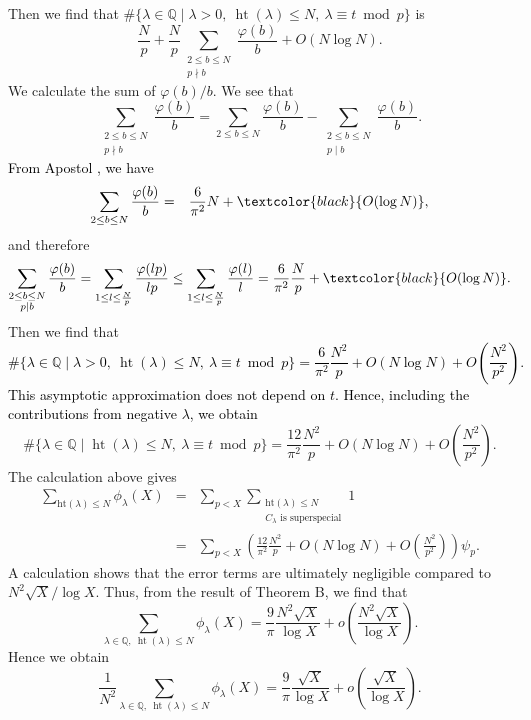 \documentclass[a4paper, 11pt]{article}
\theoremstyle{plain}
\newcommand{\?}{\textcolor{red}{??}}
\newcommand{\lm}{\lambda}
\newcommand{\bQ}{\mathbb{Q}}
\newcommand{\height}{\operatorname{ht}}
\begin{document}
\noindent
Then we find that $\# \{ \lm \in \bQ \mid \lm >0,\ \height(\lm) \le N,\ \lm \equiv t \bmod p\}$ is 
\[
 \frac{N}{p} + \frac{N}{p} \sum_{\substack{2 \le b \le N \\ p \nmid b}} \frac{\varphi(b)}{b} + O(N \log N).
\]
We calculate the sum of $\varphi(b)/b$. We see that 
\[
\sum_{\substack{2 \le b \le N \\ p \nmid b}} \frac{\varphi(b)}{b} =\sum_{2 \le b \le N} \frac{\varphi(b)}{b}- \sum_{\substack{2 \le b \le N \\ p \mid b}} \frac{\varphi(b)}{b}.
\]
\textcolor{black}{From Apostol \cite[\S 3 Exercise 5]{Apo}, we have} 
\begin{eqnarray*}
    \sum_{2 \le b \le N} \frac{\varphi(b)}{b} &=&  \frac{6}{{\pi}^2}N +\textcolor{black}{ O(\log N)},
\end{eqnarray*}
and therefore
\begin{eqnarray*}
    \sum_{\substack{2 \le b \le N \\ p \mid b}} \frac{\varphi(b)}{b}
    = \sum_{1 \le l \le \frac{N}{p}} \frac{\varphi(lp)}{lp}
    \le \sum_{1 \le l \le \frac{N}{p}} \frac{\varphi(l)}{l}= \frac{6}{{\pi}^2}\frac{N}{p} + \textcolor{black}{O(\log N)}.
\end{eqnarray*}
Then we find that \textcolor{black}{
\[
\# \{ \lm \in \bQ \mid \lm >0,\ \height (\lm) \le N,\ \lm \equiv t \bmod p\}= \frac{6}{{\pi}^2} \frac{N^2}{p} + O(N\log N) +O\left( \frac{N^2}{p^2} \right).
\]}
\textcolor{black}{This asymptotic approximation does not depend on $t$. Hence, including the contributions from negative $\lm$, we obtain}
\[
\# \{ \lm \in \bQ \mid  \height (\lm) \le N,\ \lm \equiv t \bmod p\}= \frac{12}{{\pi}^2} \frac{N^2}{p} + O(N\log N) +O\left( \frac{N^2}{p^2} \right).
\]
The calculation above gives
\begin{eqnarray*}
    \sum_{\text{ht}(\lm) \le N} {\phi}_{\lm}(X) &=& 
\sum_{p < X} \sum_{\substack{\text{ht}(\lm) \le N \\ C_{\lm} \text{ is superspecial} }} 1\\
&=& \sum_{p < X} \left(  \frac{12}{{\pi}^2} \frac{N^2}{p} + O(N\log N) +O\left( \frac{N^2}{p^2} \right) \right) {\psi}_p.
\end{eqnarray*}
A calculation shows that the error terms are ultimately negligible compared to $N^2 \sqrt{X} /\log X$. Thus, from the result of Theorem B, we find that
\[
\sum_{\lm \in \bQ,\ \height(\lm) \le N } {\phi}_{\lm}(X) = \frac{9}{\pi} \frac{N^2\sqrt{X}}{\log X} +o \left( \frac{N^2\sqrt{X}}{\log X}\right).
\]
Hence we obtain
 \[
    \frac{1}{N^2}\sum_{\lm \in \bQ,\ \height(\lm) \le N } {\phi}_{\lm}(X) = \frac{9}{\pi} \frac{\sqrt{X}}{\log X} +o \left( \frac{\sqrt{X}}{\log X}\right).
 \]
\end{document}
